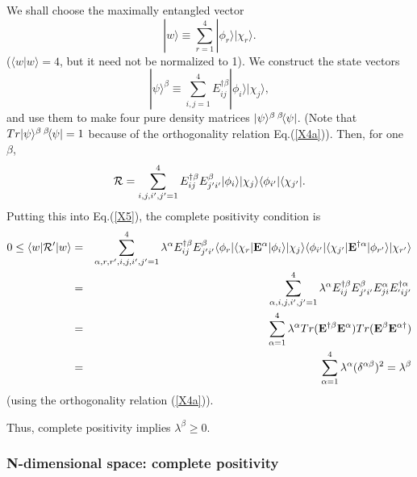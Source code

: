\documentclass[aps,pra,amssymb, amsfonts,amsmath,showpacs, superscriptaddress,12pt]{revtex4}
\begin{document}
    We shall choose the maximally entangled vector
\begin{equation}
|w\rangle\equiv\sum_{r=1}^{4}|\phi_{r}\rangle |\chi_{r}\rangle. \nonumber
\end{equation}
\noindent ($\langle w|w\rangle=4$, but it need not be normalized to 1). We construct the state vectors 
\[
|\psi\rangle^{\beta}\equiv\sum_{i,j=1}^{4}E_{ij}^{\dagger\beta}|\phi_{i}\rangle |\chi_{j}\rangle, 
\]
\noindent and  use them to make  four pure density matrices $|\psi\rangle^{\beta}\thinspace^{\beta}\negthinspace\langle\psi|$. (Note that $Tr|\psi\rangle^{\beta}\thinspace^{\beta}\negthinspace\langle\psi|=1$ because of the orthogonality relation Eq.(\ref{X4a})).  Then, for one $\beta$,   
\[
{\cal R}=\sum_{i,j,i',j'=1}^{4}E_{ij}^{\dagger\beta}E_{j'i'}^{\beta}|\phi_{i}\rangle |\chi_{j}\rangle\langle\phi_{i'}|\langle \chi_{j'}|. 
\]
\noindent  Putting this into Eq.(\ref{X5}), the complete positivity condition is 
\begin{eqnarray}
0\leq\langle w|{\cal R}'|w\rangle &=& \sum_{\alpha, r,r',i,j,i',j'=1}^{4}\lambda^{\alpha}E_{ij}^{\dagger\beta}E_{j'i'}^{\beta}\langle\phi_{r}|\langle \chi_{r}|{\bf E}^{\alpha}|\phi_{i}\rangle |\chi_{j}\rangle\langle\phi_{i'}|\langle \chi_{j'}| {\bf E}^{\dagger\alpha}
|\phi_{r'}\rangle |\chi_{r'}\rangle\nonumber\\
&=&\sum_{\alpha,i,j,i',j'=1}^{4}\lambda^{\alpha}E_{ij}^{\dagger\beta}E_{j'i'}^{\beta}E_{ji}^{\alpha}E_{'ij'}^{\dagger\alpha}\nonumber\\
&=&\sum_{\alpha=1}^{4}\lambda^{\alpha}Tr({\bf E}^{\dagger\beta}{\bf E}^{\alpha})Tr({\bf E}^{\beta}{\bf E}^{\alpha\dagger})\nonumber\\
&=&\sum_{\alpha=1}^{4}\lambda^{\alpha}
(\delta^{\alpha\beta})^{2}=\lambda^{\beta}\nonumber
\end{eqnarray}
\noindent (using the orthogonality relation (\ref{X4a})).

Thus, complete positivity implies $\lambda^{\beta}\geq 0$. 

\subsubsection{N-dimensional space: complete positivity}
\end{document}

